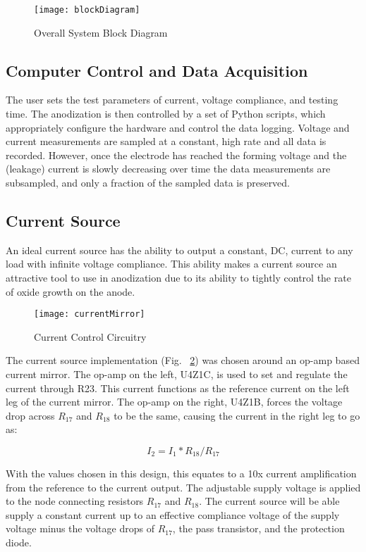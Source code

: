 \begin{figure}[here]
\centering
\texttt{[image: blockDiagram]}
\caption{Overall System Block Diagram}
\label{fig:blockDiagram}
\end{figure}

\subsection{Computer Control and Data Acquisition}

The user sets the test parameters of current, voltage compliance, and testing time. The anodization is then controlled by a set of Python scripts, which appropriately configure the hardware and control the data logging. Voltage and current measurements are sampled at a constant, high rate and all data is recorded. However, once the electrode has reached the forming voltage and the (leakage) current is slowly decreasing over time the data measurements are subsampled, and only a fraction of the sampled data is preserved.

\subsection{Current Source}

An ideal current source has the ability to output a constant, DC, current to any load with infinite voltage compliance. This ability makes a current source an attractive tool to use in anodization due to its ability to tightly control the rate of oxide growth on the anode.

\begin{figure}[here]
\centering
\texttt{[image: currentMirror]}
\caption{Current Control Circuitry}
\label{fig:currentMirror}
\end{figure}


The current source implementation (Fig. ~\ref{fig:currentMirror}) was chosen around an op-amp based current mirror. The op-amp on the left, U4Z1C, is used to set and regulate the current through R23. This current functions as the reference current on the left leg of the current mirror. The op-amp on the right, U4Z1B, forces the voltage drop across $R_{17}$ and $R_{18}$ to be the same, causing the current in the right leg to go as:

\begin{equation}
I_2 = I_1*R_{18}/R_{17}
\end{equation}

With the values chosen in this design, this equates to a 10x current amplification from the reference to the current output. The adjustable supply voltage is applied to the node connecting resistors $R_{17}$ and $R_{18}$. The current source will be able supply a constant current up to an effective compliance voltage of the supply voltage minus the voltage drops of $R_{17}$, the pass transistor, and the protection diode.

